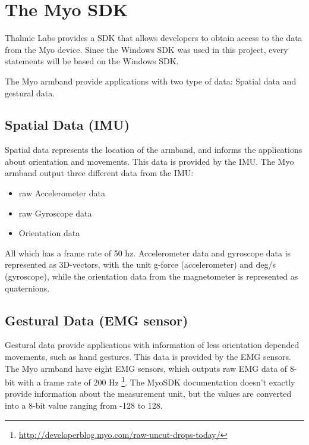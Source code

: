 \section{The Myo SDK}
\label{sec:myoSDK}
Thalmic Labs provides a SDK that allows developers to obtain access to the data from the Myo device. Since the Windows SDK was used in this project, every statements will be based on the Windows SDK.

The Myo armband provide applications with two type of data: Spatial data and gestural data.

\subsection{Spatial Data (IMU)}
Spatial data represents the location of the armband, and informs the applications about orientation and movements. This data is provided by the IMU. The Myo armband output three different data from the IMU: 
\begin{itemize}
  \item raw Accelerometer data
  \item raw Gyroscope data
  \item Orientation data
\end{itemize}
All which has a frame rate of 50 hz. Accelerometer data and gyroscope data is represented as 3D-vectors, with the unit g-force (accelerometer) and deg/s (gyroscope), while the orientation data from the magnetometer is represented as quaternions.

\subsection{Gestural Data (EMG sensor)}
Gestural data provide applications with information of less orientation depended movements, such as hand gestures. This data is provided by the EMG sensors. The Myo armband have eight EMG sensors, which outputs raw EMG data of 8-bit with a frame rate of 200 Hz \footnote{\url{http://developerblog.myo.com/raw-uncut-drops-today/}}. The MyoSDK documentation \cite{myoSDK} doesn't exactly provide information about the measurement unit, but the values are converted into a 8-bit value ranging from -128 to 128.